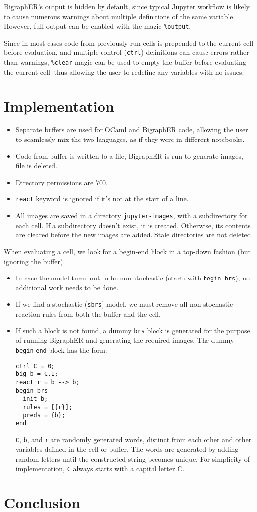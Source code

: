 \documentclass{article}
\begin{document}
BigraphER's output is hidden by default, since typical Jupyter workflow is
likely to cause numerous warnings about multiple definitions of the same
variable. However, full output can be enabled with the magic \texttt{\%output}.

Since in most cases code from previously run cells is prepended to the current
cell before evaluation, and multiple control (\texttt{ctrl}) definitions can
cause errors rather than warnings, \texttt{\%clear} magic can be used to empty
the buffer before evaluating the current cell, thus allowing the user to
redefine any variables with no issues.

\section{Implementation}

\begin{itemize}
\item Separate buffers are used for OCaml and BigraphER code, allowing the user
  to seamlessly mix the two languages, as if they were in different notebooks.
\item Code from buffer is written to a file, BigraphER is run to generate
  images, file is deleted.
\item Directory permissions are $700$.
\item \texttt{react} keyword is ignored if it's not at the start of a line.
\item All images are saved in a directory \texttt{jupyter-images}, with a
  subdirectory for each cell. If a subdirectory doesn't exist, it is created.
  Otherwise, its contents are cleared before the new images are added. Stale
  directories are not deleted.
\end{itemize}

When evaluating a cell, we look for a begin-end block in a top-down
fashion (but ignoring the buffer).
\begin{itemize}
\item In case the model turns out to be non-stochastic (starts with
  \texttt{begin brs}), no additional work needs to be done.
\item If we find a stochastic (\texttt{sbrs}) model, we must remove all
  non-stochastic reaction rules from both the buffer and the cell.
\item If such a block is not found, a dummy \texttt{brs} block is generated
  for the purpose of running BigraphER and generating the required images. The
  dummy \texttt{begin}-\texttt{end} block has the form:
  \begin{lstlisting}
ctrl C = 0;
big b = C.1;
react r = b --> b;
begin brs
  init b;
  rules = [{r}];
  preds = {b};
end
\end{lstlisting}
\texttt{C}, \texttt{b}, and \texttt{r} are randomly generated words,
distinct from each other and other variables defined in the cell or buffer.
The words are generated by adding random letters until the constructed
string becomes unique. For simplicity of implementation, \texttt{C} always
starts with a capital letter C.
\end{itemize}

\section{Conclusion}



\end{document}
